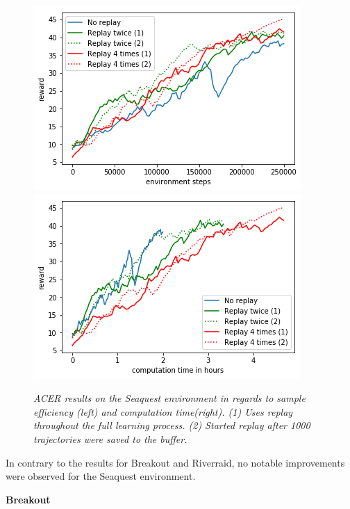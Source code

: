 \begin{figure}[h]
\includegraphics[scale=0.55]{bilder/seaquestreplayonline.png}
\includegraphics[scale=0.55]{bilder/seaquestreplaytime.png}
\caption{\textit{ACER results on the Seaquest environment in regards to sample efficiency (left) and computation time(right). (1) Uses replay throughout the full learning process. (2) Started replay after 1000 trajectories were saved to the buffer.}}
\end{figure}

In contrary to the results for Breakout and Riverraid, no notable improvements were observed for the Seaquest environment.
\pagebreak


\begin{center}
\textbf{Breakout}
\end{center}

